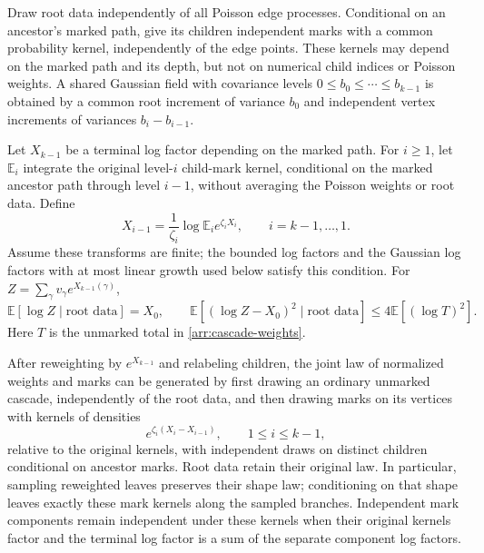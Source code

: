 Draw root data independently of all Poisson edge processes.  Conditional
on an ancestor's marked path, give its children independent marks with a
common probability kernel, independently of the edge points.  These
kernels may depend on the marked path and its depth, but not on numerical
child indices or Poisson weights.
A shared Gaussian field with covariance levels
$0\leq b_0\leq\cdots\leq b_{k-1}$ is obtained by a common root increment
of variance $b_0$ and independent vertex increments of variances
$b_i-b_{i-1}$.

\begin{lemma}
\label{arr:tilt}
Let $X_{k-1}$ be a terminal log factor depending on the marked path.
For $i\ge1$, let $\mathbb E_i$ integrate the original level-$i$
child-mark kernel, conditional on the marked ancestor path through level
$i-1$, without averaging the Poisson weights or root data. Define
\begin{equation}
 X_{i-1}=\frac1{\zeta_i}\log\mathbb E_i e^{\zeta_i X_i},
 \qquad i=k-1,\ldots,1.
 \label{arr:mark-recursion}
\end{equation}
Assume these transforms are finite; the bounded log factors and the
Gaussian log factors with at most linear growth used below satisfy this
condition.  For
$Z=\sum_\gamma v_\gamma e^{X_{k-1}(\gamma)}$,
\begin{equation}
 \mathbb E[\log Z\mid\text{root data}]=X_0,
 \qquad
 \mathbb E[(\log Z-X_0)^2\mid\text{root data}]
 \leq4\mathbb E[(\log T)^2].
 \label{arr:log-cascade}
\end{equation}
Here $T$ is the unmarked total in \eqref{arr:cascade-weights}.

After reweighting by $e^{X_{k-1}}$ and relabeling children, the joint law
of normalized weights and marks can be generated by first drawing an
ordinary unmarked cascade, independently of the root data, and then
drawing marks on its vertices with kernels of densities
\begin{equation}
 e^{\zeta_i(X_i-X_{i-1})},\qquad 1\leq i\leq k-1,
 \label{arr:tilted-kernel}
\end{equation}
relative to the original kernels, with independent draws on distinct
children conditional on ancestor marks.  Root data retain their original
law.  In particular, sampling reweighted leaves preserves their shape law;
conditioning on that shape leaves exactly these mark kernels along the
sampled branches.  Independent mark components remain independent under
these kernels when their original kernels factor and the terminal log
factor is a sum of the separate component log factors.
\end{lemma}


